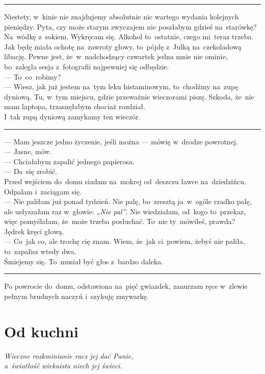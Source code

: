 \documentclass[9pt, a5paper]{memoir}
\begin{document}
\fancybreak{* \quad * \quad *}

Niestety, w~kinie nie znajdujemy absolutnie nic wartego wydania kolejnych pieniędzy. Pyta, czy może starym zwyczajem nie poszłabym gdzieś na~starówkę? Na~wódkę z~sokiem. Wykręcam się. Alkohol to~ostatnie, czego mi~teraz trzeba. Jak będę miała ochotę na~zawroty głowy, to~pójdę z~Julką na~czekoladową libację. Pewne jest, że~w~nadchodzący czwartek jedna mnie nie ominie, bo~zaległa sesja z~fotografii najpewniej się odbędzie.\\
--- To~co~robimy?\\
--- Wiesz, jak już jestem na~tym leku histaminowym, to~chodźmy na~zupę dyniową. Tu, w~tym miejscu, gdzie przeważnie wieczorami piszę. Szkoda, że~nie mam laptopa, trzasnęłabym chociaż rozdział.\\
I~tak zupą dyniową zamykamy ten wieczór.

\fancybreak{* \quad * \quad *}

--- Mam jeszcze jedno życzenie, jeśli można --- mówię w~drodze powrotnej.\\
--- Jasne, mów.\\
--- Chciałabym zapalić jednego papierosa.\\
--- Da~się zrobić.\\
Przed wejściem do~domu siadam na~mokrej od~deszczu ławce na~dziedzińcu. Odpalam i~zaciągam się.\\
--- Nie paliłam już ponad tydzień. Nie palę, bo~zresztą ja~w~ogóle rzadko palę, ale usłyszałam raz w~głowie: \textit{„Nie pal”}. Nie wiedziałam, od~kogo to~przekaz, więc pomyślałam, że~może trzeba posłuchać. To~nie ty~mówiłeś, prawda?\\
Jędrek kręci głową.\\
--- Co~jak co, ale trochę cię znam. Wiem, że~jak ci~powiem, żebyś nie paliła, to~zapalisz wtedy dwa.\\
Śmiejemy się. To~musiał być głos z~bardzo daleka.

\fancybreak{* \quad * \quad *}

Po powrocie do~domu, odstawiona na~pięć gwiazdek, zanurzam ręce w~zlewie pełnym brudnych naczyń i~szykuję zmywarkę.

\newpage
\section{Od kuchni}
{
\itshape
Wieczne rozkminianie racz jej dać Panie,\\
a~światłość wiekuista niech jej świeci.
}
\end{document}
